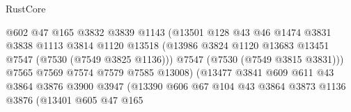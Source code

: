 \begin{lexlean}{RustCore}
\begin{coremodule}
                                        @602
                                        @47
                                        @165
                                        @3832
                                        @3839
                                        @1143
                                        (@13501
                                          @128
                                          @43
                                          @46
                                          @1474
                                          @3831
                                          @3838
                                          @1113
                                          @3814
                                          @1120
                                          @13518
                                          (@13986
                                            @3824
                                            @1120
                                            @13683
                                            @13451
                                            @7547
                                            (@7530 (@7549 @3825 @1136)))
                                          @7547
                                          (@7530 (@7549 @3815 @3831)))
                                        @7565
                                        @7569
                                        @7574
                                        @7579
                                        @7585
                                        @13008)
                                      (@13477
                                        @3841
                                        @609
                                        @611
                                        @43
                                        @3864
                                        @3876
                                        @3900
                                        @3947
                                        (@13390
                                          @606
                                          @67
                                          @104
                                          @43
                                          @3864
                                          @3873
                                          @1136
                                          @3876
                                          (@13401
                                            @605
                                            @47
                                            @165

\end{coremodule}
\end{lexlean}
